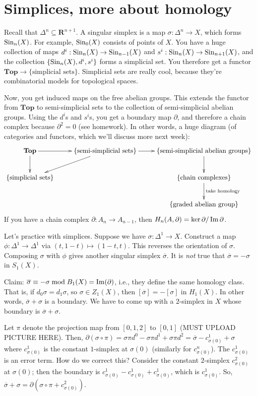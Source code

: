 \section{Simplices, more about homology}
Recall that $\Delta^n\subseteq\mathbf{R}^{n+1}$. A singular simplex is a map $\sigma:\Delta^n\to X$, which forms $\mathrm{Sin}_n(X)$. For example, $\mathrm{Sin}_0(X)$ consists of points of $X$. You have a huge collection of maps $d^i:\mathrm{Sin}_n(X)\to\mathrm{Sin}_{n-1}(X)$ and $s^i:\mathrm{Sin}_n(X)\to\mathrm{Sin}_{n+1}(X)$, and the collection $\{\mathrm{Sin}_n(X),d^i,s^i\}$ forms a simplicial set. You therefore get a functor $\mathbf{Top}\to\{\text{simplicial sets}\}$. Simplicial sets are really cool, because they're combinatorial models for topological spaces.

Now, you get induced maps on the free abelian groups. This extends the functor from $\mathbf{Top}$ to semi-simplicial sets to the collection of semi-simplicial abelian groups. Using the $d^i$s and $s^i$s, you get a boundary map $\partial$, and therefore a chain complex because $\partial^2=0$ (see homework). In other words, a huge diagram (of categories and functors, which we'll discuss more next week):
\begin{equation*}
\xymatrix{\mathbf{Top}\ar[d]\ar[r] & \{\text{semi-simplicial sets}\}\ar[dl]\ar[r] & \{\text{semi-simplicial abelian groups}\}\ar[d]\\
 \{\text{simplicial sets}\} & & \{\text{chain complexes}\}\ar[d]^{\text{take homology}}\\
 & &\{\text{graded abelian group}\}}
\end{equation*}
If you have a chain complex $\partial:A_n\to A_{n-1}$, then $ H_n(A,\partial)=\ker\partial/\operatorname{Im}\partial$.

Let's practice with simplices. Suppose we have $\sigma:\Delta^1\to X$. Construct a map $\phi:\Delta^1\to\Delta^1$ via $(t,1-t)\mapsto (1-t,t)$. This reverses the orientation of $\sigma$. Composing $\sigma$ with $\phi$ gives another singular simplex $\overline{\sigma}$. It is \textit{not} true that $\overline{\sigma}=-\sigma$ in $S_1(X)$.

Claim: $\overline{\sigma}\equiv -\sigma\bmod B_1(X)=\operatorname{Im}(\partial)$, i.e., they define the same homology class. That is, if $d_0\sigma=d_1\sigma$, so $\sigma\in Z_1(X)$, then $[\overline{\sigma}]=-[\sigma]$ in $ H_1(X)$. In other words, $\overline{\sigma}+\sigma$ is a boundary. We have to come up with a $2$-simplex in $X$ whose boundary is $\overline{\sigma}+\sigma$.

Let $\pi$ denote the projection map from $[0,1,2]$ to $[0,1]$ (MUST UPLOAD PICTURE HERE). Then, $\partial(\sigma\circ\pi)=\sigma\pi d^0-\sigma\pi d^1 +\sigma\pi d^2=\overline{\sigma}-c^1_{\sigma(0)}+\sigma$ where $c^1_{\sigma(0)}$ is the constant $1$-simplex at $\sigma(0)$ (similarly for $c^n_{\sigma(0)}$). The $c^1_{\sigma(0)}$ is an error term. How do we correct this? Consider the constant $2$-simplex $c^2_{\sigma(0)}$ at $\sigma(0)$; then the boundary is $c^1_{\sigma(0)}-c^1_{\sigma(0)}+c^1_{\sigma(0)}$, which is $c^1_{\sigma(0)}$. So, $\overline{\sigma}+\sigma=\partial(\sigma\circ\pi + c^2_{\sigma(0)})$.

